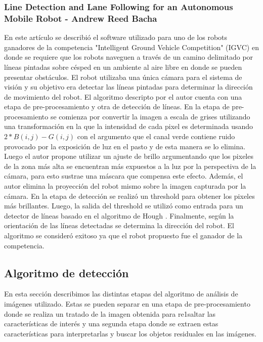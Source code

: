 	\subsubsection{Line Detection and Lane Following for an Autonomous Mobile Robot - Andrew Reed Bacha}
	En este artículo se describió el software utilizado para uno de los robots ganadores de la competencia "Intelligent Ground Vehicle Competition" (IGVC) en donde se requiere que los robots naveguen  a través de un camino delimitado por líneas pintadas sobre césped en un ambiente al aire libre en donde se pueden presentar obstáculos. El robot utilizaba una única cámara para el sistema de visión y su objetivo era detectar las líneas pintadas 
para determinar la dirección de movimiento del robot. El algoritmo 
descripto por el autor cuenta con una etapa de pre-procesamiento y otra 
de detección de líneas. En la etapa de pre-procesamiento se comienza 
por convertir la imagen a escala de grises utilizando una 
transformación en la que la intensidad de cada pixel es determinada 
usando $2*B(i,j) - G(i,j)$ con el argumento que el canal verde contiene 
ruido provocado por la exposición de luz en el pasto y de esta manera 
se lo elimina. Luego el autor propone utilizar un ajuste de brillo 
argumentando que los pixeles de la zona más alta se encuentran más 
expuestos a la luz por la perspectiva de la cámara, para esto sustrae 
una máscara que compensa este efecto. Además, el autor elimina la 
proyección del robot mismo sobre la imagen capturada por la cámara. 
En la etapa de detección se realizó un threshold para obtener los 
pixeles más brillantes. Luego, la salida del threshold se utilizó 
como entrada para un detector de líneas basado en el algoritmo de 
Hough \cite{hough62}. Finalmente, según la orientación de las líneas detectadas se determina la dirección del robot. El algoritmo se consideró exitoso ya que el robot propuesto fue el ganador de la competencia.
\pagebreak

	
\subsection{Algoritmo de detección}
En esta sección describimos las distintas etapas del algoritmo de análisis 
de imágenes utilizado. Estas se pueden separar en una etapa de 
pre-procesamiento donde se realiza un tratado de la imagen obtenida 
para re1saltar las características de interés y  una segunda etapa donde se 
extraen estas características para interpretarlas y  buscar 
los objetos residuales en las imágenes.

